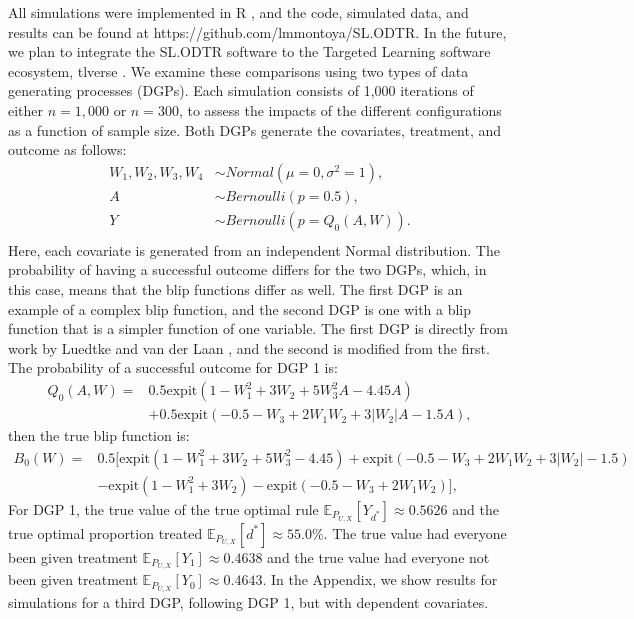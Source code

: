 \documentclass[a4paper,12pt]{article}
\begin{document}
All simulations were implemented in R \citep{R}, and the code, simulated data, and results can be found at https://github.com/lmmontoya/SL.ODTR. In the future, we plan to integrate the SL.ODTR software to the Targeted Learning software ecosystem, tlverse \citep{tlverse}. We examine these comparisons using two types of data generating processes (DGPs). Each simulation consists of 1,000 iterations of either $n=1,000$ or $n = 300$, to assess the impacts of the different configurations as a function of sample size. Both DGPs generate the covariates, treatment, and outcome as follows:
\begin{align*}
W_1,W_2,W_3,W_4 &\sim Normal(\mu=0,\sigma^2=1), \\
A &\sim Bernoulli(p=0.5), \\
Y &\sim Bernoulli(p=Q_0(A,W)).\\
\end{align*}
Here, each covariate is generated from an independent Normal distribution. The probability of having a successful outcome differs for the two DGPs, which, in this case, means that the blip functions differ as well. The first DGP is an example of a complex blip function, and the second DGP is one with a blip function that is a simpler function of one variable.  The first DGP is directly from work by Luedtke and van der Laan \citep{luedtke2016super, luedtke2016optimal, van2015targeted}, and the second is modified from the first. The probability of a successful outcome for DGP 1 is:
\begin{align*}
Q_0(A,W) =& 0.5 \textrm{expit}(1-W_1^2  + 3W_2  + 5W_3^2 A - 4.45A)\\
&+0.5\textrm{expit} (-0.5- W_3  + 2W_1 W_2  + 3|W_2|A - 1.5A),
\end{align*}
then the true blip function is:
\begin{align*}
    B_0 (W)= & 0.5[\textrm{expit} (1-W_1^2  + 3W_2  + 5W_3^2  - 4.45)+\textrm{expit} (-0.5- W_3  + 2W_1 W_2  + 3|W_2|  - 1.5)\\
& - \textrm{expit} (1-W_1^2  + 3W_2 )-\textrm{expit} (-0.5- W_3  + 2W_1 W_2 )],
\end{align*}
For DGP 1, the true value of the true optimal rule $\mathbb{E}_{P_{U,X}} [Y_{d^*} ] \approx 0.5626$ and the true optimal proportion treated $\mathbb{E}_{P_{U,X} } [d^* ] \approx 55.0\%$. The true value had everyone been given treatment $\mathbb{E}_{P_{U,X}} [Y_1 ] \approx 0.4638$ and the true value had everyone not been given treatment $\mathbb{E}_{P_{U,X}} [Y_0 ] \approx 0.4643$. In the Appendix, we show results for simulations for a third DGP, following DGP 1, but with dependent covariates.
\end{document}
